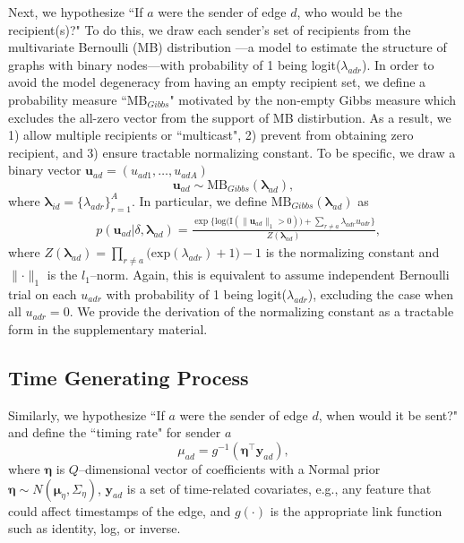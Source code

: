 \documentclass[12pt]{article}
\begin{document}
Next, we hypothesize ``If $a$ were the sender of edge $d$, who would be the recipient(s)?" To do this, we draw each sender's set of recipients from the multivariate Bernoulli (MB) distribution \citep{dai2013multivariate}---a model to estimate the structure of graphs with binary nodes---with probability of 1 being logit($\lambda_{adr}$). In order to avoid the model degeneracy from having an empty recipient set, we define a probability measure ``MB$_{Gibbs}$" motivated by the non-empty Gibbs measure \citep{fellows2017removing} which excludes the all-zero vector from the support of MB distirbution. As a result, we 1) allow multiple recipients or ``multicast", 2) prevent from obtaining zero recipient, and 3) ensure tractable normalizing constant. To be specific, we draw a binary vector $\boldsymbol{u}_{ad}= (u_{ad1},
\ldots, u_{adA})$ 
\begin{equation} \boldsymbol{u}_{ad}  \sim
\mbox{MB}_{Gibbs}(\boldsymbol{\lambda}_{ad}),
\end{equation}
where $\boldsymbol{\lambda}_{id}= \{\lambda_{adr}\}_{r=1}^A$. In particular, we define $\mbox{MB}_{Gibbs}(\boldsymbol{\lambda}_{ad})$ as
\begin{equation}
\begin{aligned}
&p(\boldsymbol{u}_{ad}|\delta, \boldsymbol{\lambda}_{ad}) = \frac{\exp\Big\{\mbox{log}\big(\text{I}( \lVert \boldsymbol{u}_{ad}\rVert_1 > 0 )\big) + \sum_{r\neq a} \lambda_{adr}u_{adr}\Big\}}{Z(\boldsymbol{\lambda}_{ad})} ,
\end{aligned}
\label{eqn:Gibbs}
\end{equation}
where $Z(\boldsymbol{\lambda}_{ad})= \prod_{r \neq a} \big(\mbox{exp}(\lambda_{adr}) + 1\big)-1$ is the normalizing constant and $\lVert \cdot \rVert_1$ is the $l_1$--norm. Again, this is equivalent to assume independent Bernoulli trial on each $u_{adr}$ with probability of 1 being logit($\lambda_{adr}$), excluding the case when all $u_{adr}=0$. We provide the derivation of the normalizing constant as a tractable form in the supplementary material. 


\subsection{Time Generating Process}\label{subsec:Time}
Similarly, we hypothesize ``If $a$ were the sender of edge $d$, when would it be sent?" and define the ``timing rate" for sender $a$
\begin{equation}
\mu_{ad} = g^{-1}(\boldsymbol{\eta}^\top \boldsymbol{y}_{ad}),
\end{equation}
where $\boldsymbol{\eta}$ is $Q$--dimensional vector of coefficients with a Normal prior $\boldsymbol{\eta} \sim N(\boldsymbol{\mu}_\eta,\Sigma_\eta)$, $\boldsymbol{y}_{ad}$ is a set of time-related covariates, e.g., any feature that could affect timestamps of the edge, and $g(\cdot)$ is the appropriate link function such as identity, log, or inverse. 
\end{document}
